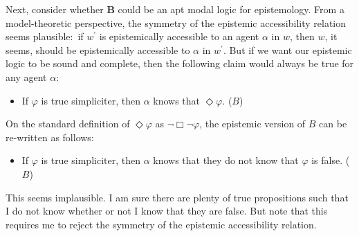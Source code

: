 \documentclass[11pt]{article}
\theoremstyle{definition}
\theoremstyle{remark}
\begin{document}
Next, consider whether \textbf{B} could be an apt modal logic for epistemology. From a model-theoretic perspective, the symmetry of the epistemic accessibility relation seems plausible:\ if $w^{\prime}$ is epistemically accessible to an agent $\alpha$ in $w$, then $w$, it seems, should be epistemically accessible to $\alpha$ in $w^{\prime}$. But if we want our epistemic logic to be sound and complete, then the following claim would always be true for any agent $\alpha$:
\begin{itemize}
    \item If $\varphi$ is true simpliciter, then $\alpha$ knows that $\Diamond \varphi$. ($B$)
\end{itemize}
On the standard definition of $\Diamond \varphi$ as $\neg\Box \neg \varphi$, the epistemic version of $B$ can be re-written as follows:
\begin{itemize}
    \item If $\varphi$ is true simpliciter, then $\alpha$ knows that they do not know that $\varphi$ is false. ($B$)
\end{itemize}
This seems implausible. I am sure there are plenty of true propositions such that I do not know whether or not I know that they are false. But note that this requires me to reject the symmetry of the epistemic accessibility relation.\par 
\end{document}
